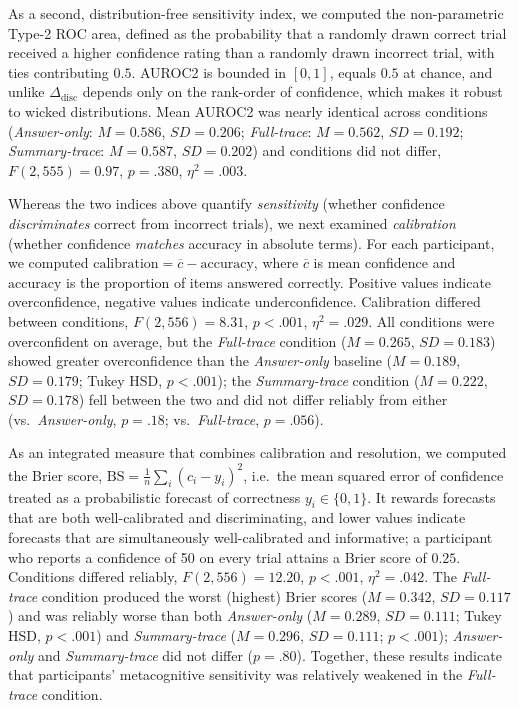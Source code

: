 \documentclass[manuscript, anonymous=false,authorversion,review=false]{acmart}
\begin{document}
As a second, distribution-free sensitivity index, we computed the non-parametric Type-2 ROC area, defined as the probability that a randomly drawn correct trial received a higher confidence rating than a randomly drawn incorrect trial, with ties contributing $0.5$. AUROC2 is bounded in $[0,1]$, equals $0.5$ at chance, and unlike
$\Delta_{\text{disc}}$ depends only on the rank-order of confidence, which makes it robust to wicked distributions. Mean AUROC2 was nearly identical across conditions
(\textit{Answer-only}: $M = 0.586$, $SD = 0.206$; \textit{Full-trace}: $M = 0.562$, $SD = 0.192$;
\textit{Summary-trace}: $M = 0.587$, $SD = 0.202$) and conditions did not differ, $F(2, 555) = 0.97$, $p = .380$, $\eta^2 = .003$.

Whereas the two indices above quantify \emph{sensitivity} (whether confidence \emph{discriminates} correct from incorrect trials), we
next examined \emph{calibration} (whether confidence \emph{matches} accuracy in absolute terms). For each participant, we computed
$\mathrm{calibration} = \overline{c} - \mathrm{accuracy}$, where $\overline{c}$ is mean confidence and $\mathrm{accuracy}$ is the proportion of items answered correctly. Positive values indicate overconfidence, negative values indicate underconfidence. Calibration differed between conditions, $F(2, 556) = 8.31$, $p < .001$, $\eta^2 = .029$.
All conditions were overconfident on average, but the \textit{Full-trace} condition ($M = 0.265$, $SD = 0.183$) showed greater overconfidence
than the \textit{Answer-only }baseline ($M = 0.189$, $SD = 0.179$; Tukey HSD, $p < .001$); the \textit{Summary-trace} condition ($M = 0.222$, $SD = 0.178$) fell between the
two and did not differ reliably from either (vs.\ \textit{Answer-only}, $p = .18$; vs.\ \textit{Full-trace}, $p = .056$).


As an integrated measure that combines calibration and resolution, we computed the Brier score, $\mathrm{BS} = \tfrac{1}{n}\sum_{i}(c_i - y_i)^2$, i.e.\ the mean squared error of confidence treated as a probabilistic forecast of correctness $y_i \in \{0,1\}$. It rewards forecasts that are both well-calibrated and discriminating, and lower values indicate forecasts that are simultaneously well-calibrated and informative; a participant who reports a confidence of 50 on every trial attains a Brier score of $0.25$. Conditions differed reliably, $F(2, 556) = 12.20$, $p < .001$, $\eta^2 = .042$. The \textit{Full-trace} condition produced the worst (highest) Brier scores ($M = 0.342$, $SD = 0.117$) and was reliably worse than both \textit{Answer-only} ($M = 0.289$, $SD = 0.111$; Tukey HSD, $p < .001$) and \textit{Summary-trace} ($M = 0.296$, $SD = 0.111$; $p < .001$); \textit{Answer-only} and \textit{Summary-trace} did not differ ($p = .80$). Together, these results indicate that participants' metacognitive sensitivity was relatively weakened in the \textit{Full-trace} condition.
\end{document}
